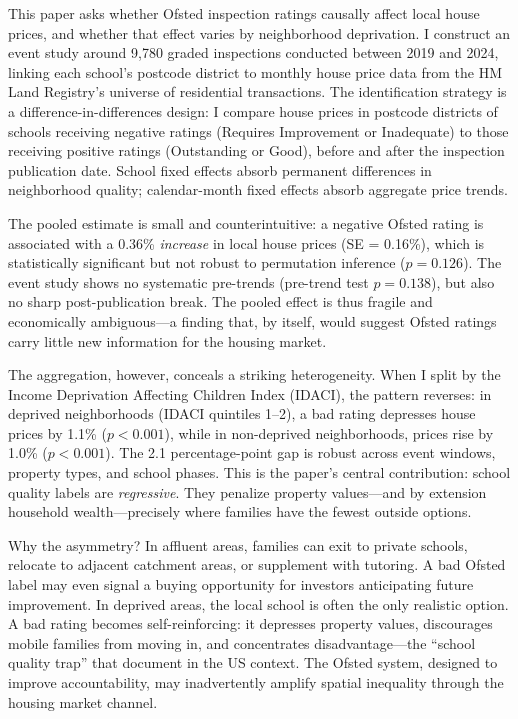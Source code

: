 \documentclass[12pt]{article}
\begin{document}
This paper asks whether Ofsted inspection ratings causally affect local house prices, and whether that effect varies by neighborhood deprivation. I construct an event study around 9,780 graded inspections conducted between 2019 and 2024, linking each school's postcode district to monthly house price data from the HM Land Registry's universe of residential transactions. The identification strategy is a difference-in-differences design: I compare house prices in postcode districts of schools receiving negative ratings (Requires Improvement or Inadequate) to those receiving positive ratings (Outstanding or Good), before and after the inspection publication date. School fixed effects absorb permanent differences in neighborhood quality; calendar-month fixed effects absorb aggregate price trends.

The pooled estimate is small and counterintuitive: a negative Ofsted rating is associated with a 0.36\% \textit{increase} in local house prices (SE = 0.16\%), which is statistically significant but not robust to permutation inference ($p = 0.126$). The event study shows no systematic pre-trends (pre-trend test $p = 0.138$), but also no sharp post-publication break. The pooled effect is thus fragile and economically ambiguous---a finding that, by itself, would suggest Ofsted ratings carry little new information for the housing market.

The aggregation, however, conceals a striking heterogeneity. When I split by the Income Deprivation Affecting Children Index (IDACI), the pattern reverses: in deprived neighborhoods (IDACI quintiles 1--2), a bad rating depresses house prices by 1.1\% ($p < 0.001$), while in non-deprived neighborhoods, prices rise by 1.0\% ($p < 0.001$). The 2.1 percentage-point gap is robust across event windows, property types, and school phases. This is the paper's central contribution: school quality labels are \textit{regressive}. They penalize property values---and by extension household wealth---precisely where families have the fewest outside options.

Why the asymmetry? In affluent areas, families can exit to private schools, relocate to adjacent catchment areas, or supplement with tutoring. A bad Ofsted label may even signal a buying opportunity for investors anticipating future improvement. In deprived areas, the local school is often the only realistic option. A bad rating becomes self-reinforcing: it depresses property values, discourages mobile families from moving in, and concentrates disadvantage---the ``school quality trap'' that \citet{hastings2009heterogeneous} document in the US context. The Ofsted system, designed to improve accountability, may inadvertently amplify spatial inequality through the housing market channel.
\end{document}

